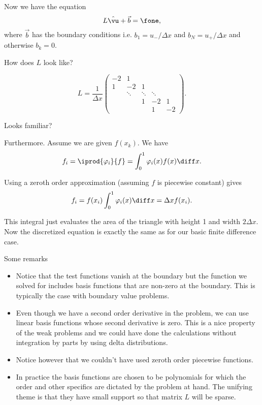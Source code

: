 \begin{frame}
	Now we have the equation
	\[ L \hat{\vu} + \vec{b} = \fone, \]
	where $ \vec{b} $ has the boundary conditions i.e. $ b_1 = u_-/\Delta x $ and $ b_N = u_+/\Delta x $ and otherwise $ b_k = 0 $. 
	
	\pause
	How does $ L $ look like?
	
	\pause
	\[ L = \frac{1}{\Delta x} \begin{pmatrix}
		-2 & 1 &  && \\
		1 & -2 & 1 && \\
		& \ddots & \ddots & \ddots& \\
		&&1 &-2& 1 \\
		&&& 1 &-2 
	\end{pmatrix}. \]

	Looks familiar? 
\end{frame}

\begin{frame}
	Furthermore. Assume we are given $ f(x_k) $. We have 
	\[ f_i = \iprod{\varphi_i}{f} = \int_0^{1} \varphi_i (x) f(x) \diff x. \]
	
	\pause
	Using a zeroth order approximation (assuming $ f $ is piecewise constant) gives 
	\[ f_i = f(x_i) \int_0^{1} \varphi_i (x)  \diff x  = \Delta xf(x_i).  \]
	
	\pause
	This integral just evaluates the area of the triangle with height 1 and width $ 2 \Delta x $. Now the discretized equation is exactly the same as for our basic finite difference case.  
\end{frame}

\begin{frame}{Some remarks}
	\begin{itemize}[<+->]
		\item Notice that the test functions vanish at the boundary but the function we solved for includes basis functions that are non-zero at the boundary. This is typically the case with boundary value problems. 
		\item Even though we have a second order derivative in the problem, we can use linear basis functions whose second derivative is zero. This is a nice property of the weak problems and we could have done the calculations without integration by parts by using delta distributions.
		\item Notice however that we couldn't have used zeroth order piecewise functions. 
		\item In practice the basis functions are chosen to be polynomials for which the order and other specifics are dictated by the problem at hand. The unifying theme is that they have small support so that matrix $ L $ will be sparse. 
	\end{itemize}
\end{frame}

